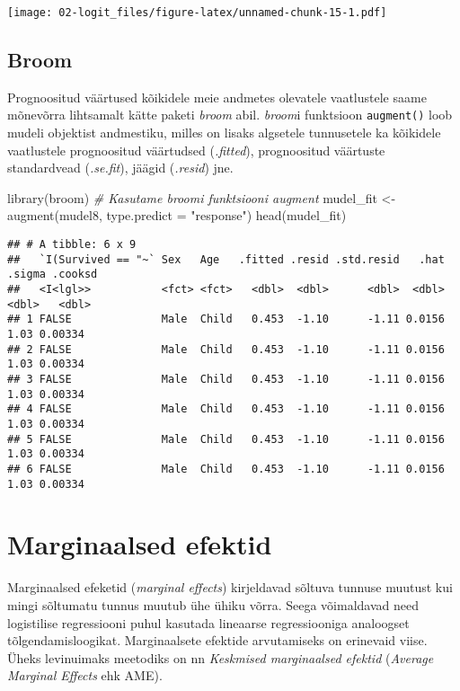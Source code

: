 \documentclass[
]{book}
\newenvironment{Shaded}{\begin{snugshade}}{\end{snugshade}}
\newcommand{\AttributeTok}[1]{\textcolor[rgb]{0.77,0.63,0.00}{#1}}
\newcommand{\CommentTok}[1]{\textcolor[rgb]{0.56,0.35,0.01}{\textit{#1}}}
\newcommand{\FunctionTok}[1]{\textcolor[rgb]{0.00,0.00,0.00}{#1}}
\newcommand{\NormalTok}[1]{#1}
\newcommand{\OtherTok}[1]{\textcolor[rgb]{0.56,0.35,0.01}{#1}}
\newcommand{\StringTok}[1]{\textcolor[rgb]{0.31,0.60,0.02}{#1}}
\begin{document}
\texttt{[image: 02-logit\_files/figure-latex/unnamed-chunk-15-1.pdf]}

\hypertarget{broom}{%
\subsection{Broom}\label{broom}}

Prognoositud väärtused kõikidele meie andmetes olevatele vaatlustele saame mõnevõrra lihtsamalt kätte paketi \emph{broom} abil. \emph{broom}i funktsioon \texttt{augment()} loob mudeli objektist andmestiku, milles on lisaks algsetele tunnusetele ka kõikidele vaatlustele prognoositud väärtudsed (\emph{.fitted}), prognoositud väärtuste standardvead (\emph{.se.fit}), jäägid (\emph{.resid}) jne.

\begin{Shaded}
\begin{Highlighting}[]
\FunctionTok{library}\NormalTok{(broom)}
\CommentTok{\# Kasutame broomi funktsiooni augment }
\NormalTok{mudel\_fit }\OtherTok{\textless{}{-}} \FunctionTok{augment}\NormalTok{(mudel8, }\AttributeTok{type.predict =} \StringTok{"response"}\NormalTok{)}
\FunctionTok{head}\NormalTok{(mudel\_fit)}
\end{Highlighting}
\end{Shaded}

\begin{verbatim}
## # A tibble: 6 x 9
##   `I(Survived == "~` Sex   Age   .fitted .resid .std.resid   .hat .sigma .cooksd
##   <I<lgl>>           <fct> <fct>   <dbl>  <dbl>      <dbl>  <dbl>  <dbl>   <dbl>
## 1 FALSE              Male  Child   0.453  -1.10      -1.11 0.0156   1.03 0.00334
## 2 FALSE              Male  Child   0.453  -1.10      -1.11 0.0156   1.03 0.00334
## 3 FALSE              Male  Child   0.453  -1.10      -1.11 0.0156   1.03 0.00334
## 4 FALSE              Male  Child   0.453  -1.10      -1.11 0.0156   1.03 0.00334
## 5 FALSE              Male  Child   0.453  -1.10      -1.11 0.0156   1.03 0.00334
## 6 FALSE              Male  Child   0.453  -1.10      -1.11 0.0156   1.03 0.00334
\end{verbatim}

\hypertarget{marginaalsed-efektid}{%
\section{Marginaalsed efektid}\label{marginaalsed-efektid}}

Marginaalsed efeketid (\emph{marginal effects}) kirjeldavad sõltuva tunnuse muutust kui mingi sõltumatu tunnus muutub ühe ühiku võrra. Seega võimaldavad need logistilise regressiooni puhul kasutada lineaarse regressiooniga analoogset tõlgendamisloogikat. Marginaalsete efektide arvutamiseks on erinevaid viise. Üheks levinuimaks meetodiks on nn \emph{Keskmised marginaalsed efektid} (\emph{Average Marginal Effects} ehk AME).
\end{document}
